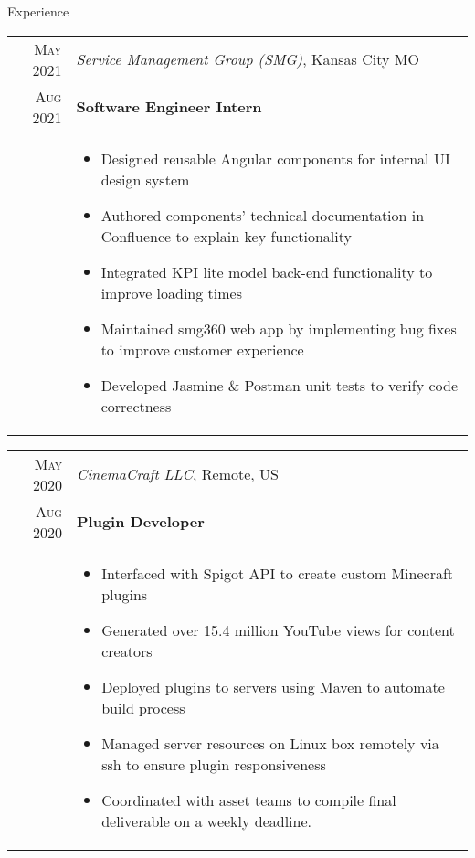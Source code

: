 \documentclass{resume}
\begin{document}
\begin{rSection}{Experience}
\small
{
  \begin{tabular}{r|p{15cm}}
    \textsc{May 2021} & \textit{Service Management Group (SMG)}, Kansas City MO \\
    \textsc{Aug 2021}  & \textbf{Software Engineer Intern} \\ &
    \begin{itemize}
      \item {Designed reusable Angular components for internal UI design system}
      \item {Authored components' technical documentation in Confluence to explain key functionality}
      \item {Integrated KPI lite model back-end functionality to improve loading times}
      \item {Maintained smg360 web app by implementing bug fixes to improve customer experience}
      \item {Developed Jasmine \& Postman unit tests to verify code correctness}
    \end{itemize}
  \end{tabular}
  
  \begin{tabular}{r|p{15cm}}
    \textsc{May 2020} & \textit{CinemaCraft LLC}, Remote, US \\
    \textsc{Aug 2020} & \textbf{Plugin Developer} \\ &
    \begin{itemize}
      \item {Interfaced with Spigot API to create custom Minecraft plugins}
      \item {Generated over 15.4 million YouTube views for content creators}
      \item {Deployed plugins to servers using Maven to automate build process}
      \item {Managed server resources on Linux box remotely via ssh to ensure plugin responsiveness}
      \item {Coordinated with  asset teams to compile final deliverable on a weekly deadline.}
    \end{itemize}
  \end{tabular}
  
}
\end{rSection}
\end{document}
